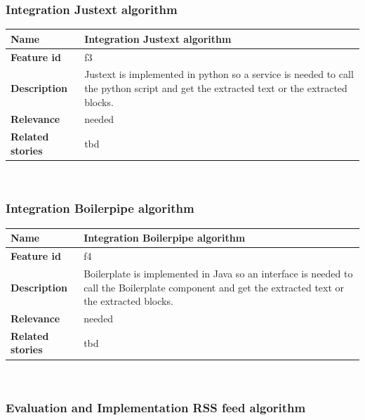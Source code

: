 \subsubsection{Integration Justext algorithm}
\label{subsec:Integration Justext algorithm}

	\begin{tabular}{ | p{3cm} | p{12cm} |}
	\hline
	\textbf{Name} 				& Integration Justext algorithm \\ \hline
	\textbf{Feature id} 		& f3 \\ \hline
	\textbf{Description} 		& Justext is implemented in python so a service is needed to call the python script and get the extracted text or the extracted blocks.\\ \hline
	\textbf{Relevance} 			& needed \\ \hline
	\textbf{Related stories} 	& tbd \\ \hline
	\end{tabular} \\

\subsubsection{Integration Boilerpipe algorithm}
\label{subsec:Integration Boilerpipe algorithm}

	\begin{tabular}{ | p{3cm} | p{12cm} |}
	\hline
	\textbf{Name} 				& Integration Boilerpipe algorithm \\ \hline
	\textbf{Feature id} 		& f4 \\ \hline
	\textbf{Description} 		& Boilerplate is implemented in Java so an interface is needed to call the Boilerplate component and get the extracted text or the extracted blocks.\\ \hline
	\textbf{Relevance} 			& needed \\ \hline
	\textbf{Related stories} 	& tbd \\ \hline
	\end{tabular} \\

\subsubsection{Evaluation and Implementation RSS feed algorithm}
\label{subsec:Evaluation and Implementation RSS feed algorithm}

